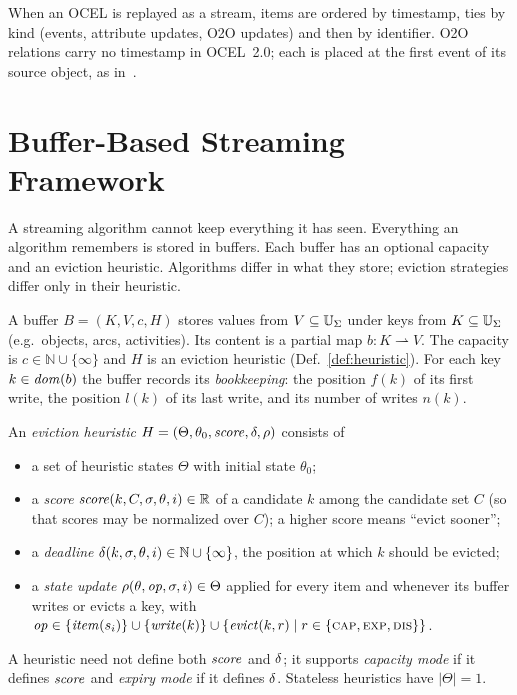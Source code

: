 \begin{remark}
When an OCEL is replayed as a stream, items are ordered by timestamp, ties by
kind (events, attribute updates, O2O updates) and then by identifier. O2O
relations carry no timestamp in OCEL~2.0; each is placed at the first event of
its source object, as in~\cite{Liss2025}.
\end{remark}

\section{Buffer-Based Streaming Framework}\label{sec:framework}

A streaming algorithm cannot keep everything it has seen. Everything an
algorithm remembers is stored in buffers. Each buffer has an optional capacity
and an eviction heuristic. Algorithms differ in what they store; eviction
strategies differ only in their heuristic.

\begin{definition}[Buffer]\label{def:buffer}
A buffer $B = (K, V, c, H)$ stores values from $V \subseteq \mathbb{U}_{\Sigma}$ under keys
from $K \subseteq \mathbb{U}_{\Sigma}$ (e.g.\ objects, arcs, activities). Its content is a
partial map $b \colon K \rightharpoonup V$. The capacity is
$c \in \mathbb{N} \cup \{\infty\}$ and $H$ is an eviction heuristic
(Def.~\ref{def:heuristic}). For each key $k \in \mathit{dom}(b)$ the buffer records
its \emph{bookkeeping}: the position $f(k)$ of its first write, the position
$l(k)$ of its last write, and its number of writes $n(k)$.
\end{definition}

\begin{definition}\label{def:heuristic}
An \emph{eviction heuristic} $H = (\Theta, \theta_0, \mathit{score}, \delta, \rho)$
consists of
\begin{itemize}
  \item a set of heuristic states $\Theta$ with initial state $\theta_0$;
  \item a \emph{score} $\mathit{score}(k, C, \sigma, \theta, i) \in \mathbb{R}$ of a
        candidate $k$ among the candidate set $C$ (so that scores may be
        normalized over $C$); a higher score means ``evict sooner'';
  \item a \emph{deadline} $\delta(k, \sigma, \theta, i) \in \mathbb{N} \cup \{\infty\}$,
        the position at which $k$ should be evicted;
  \item a \emph{state update} $\rho(\theta, \mathit{op}, \sigma, i) \in \Theta$
        applied for every item and whenever its buffer writes or evicts a key, with
        $\mathit{op} \in \{\mathit{item}(s_i)\} \cup \{\mathit{write}(k)\} \cup \{\mathit{evict}(k, r) \mid r \in \{\textsc{cap}, \textsc{exp}, \textsc{dis}\}\}$.
\end{itemize}
A heuristic need not define both $\mathit{score}$ and $\delta$; it supports
\emph{capacity mode} if it defines $\mathit{score}$ and \emph{expiry mode} if it
defines $\delta$. Stateless heuristics have $|\Theta| = 1$.
\end{definition}

